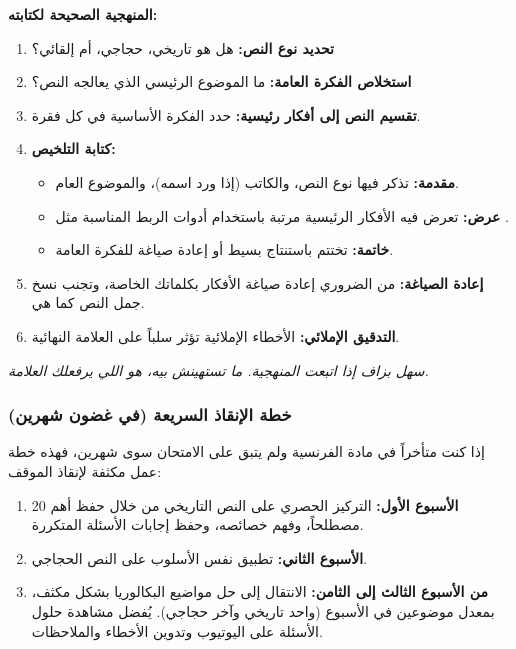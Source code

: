\documentclass[12pt,a4paper]{book}
\newcommand{\quoteAr}[1]{%
	\begin{myquote}
		\itshape #1
	\end{myquote}
}
\begin{document}
	\textbf{المنهجية الصحيحة لكتابته:}
	
	\begin{enumerate}
		\item \textbf{تحديد نوع النص:} هل هو تاريخي، حجاجي، أم إلقائي؟
		\item \textbf{استخلاص الفكرة العامة:} ما الموضوع الرئيسي الذي يعالجه النص؟
		\item \textbf{تقسيم النص إلى أفكار رئيسية:} حدد الفكرة الأساسية في كل فقرة.
		\item \textbf{كتابة التلخيص:}
		\begin{itemize}
			\item \textbf{مقدمة:} تذكر فيها نوع النص، والكاتب (إذا ورد اسمه)، والموضوع العام.
			\item \textbf{عرض:} تعرض فيه الأفكار الرئيسية مرتبة باستخدام أدوات الربط المناسبة مثل .
			\item \textbf{خاتمة:} تختتم باستنتاج بسيط أو إعادة صياغة للفكرة العامة.
		\end{itemize}
		\item \textbf{إعادة الصياغة:} من الضروري إعادة صياغة الأفكار بكلماتك الخاصة، وتجنب نسخ جمل النص كما هي.
		\item \textbf{التدقيق الإملائي:} الأخطاء الإملائية تؤثر سلباً على العلامة النهائية.
	\end{enumerate}
	
	\quoteAr{ سهل بزاف إذا اتبعت المنهجية. ما تستهينش بيه، هو اللي يرفعلك العلامة.}
	
	\subsubsection{خطة الإنقاذ السريعة (في غضون شهرين)}
	
	إذا كنت متأخراً في مادة الفرنسية ولم يتبق على الامتحان سوى شهرين، فهذه خطة عمل مكثفة لإنقاذ الموقف:
	
	\begin{enumerate}
		\item \textbf{الأسبوع الأول:} التركيز الحصري على النص التاريخي من خلال حفظ أهم 20 مصطلحاً، وفهم خصائصه، وحفظ إجابات الأسئلة المتكررة.
		\item \textbf{الأسبوع الثاني:} تطبيق نفس الأسلوب على النص الحجاجي.
		\item \textbf{من الأسبوع الثالث إلى الثامن:} الانتقال إلى حل مواضيع البكالوريا بشكل مكثف، بمعدل موضوعين في الأسبوع (واحد تاريخي وآخر حجاجي). يُفضل مشاهدة حلول الأسئلة على اليوتيوب وتدوين الأخطاء والملاحظات.
	\end{enumerate}
	
\end{document}
